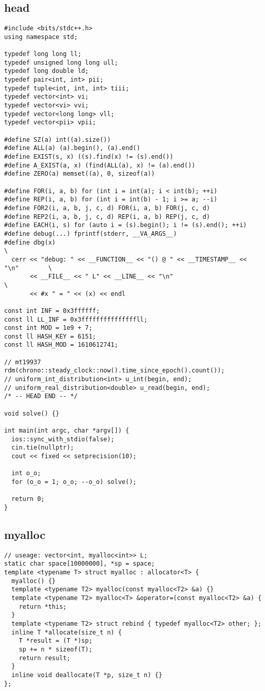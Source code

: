 \documentclass[twoside]{article}
\begin{document}
\subsection{head}
\begin{lstlisting}
#include <bits/stdc++.h>
using namespace std;

typedef long long ll;
typedef unsigned long long ull;
typedef long double ld;
typedef pair<int, int> pii;
typedef tuple<int, int, int> tiii;
typedef vector<int> vi;
typedef vector<vi> vvi;
typedef vector<long long> vll;
typedef vector<pii> vpii;

#define SZ(a) int((a).size())
#define ALL(a) (a).begin(), (a).end()
#define EXIST(s, x) ((s).find(x) != (s).end())
#define A_EXIST(a, x) (find(ALL(a), x) != (a).end())
#define ZERO(a) memset((a), 0, sizeof(a))

#define FOR(i, a, b) for (int i = int(a); i < int(b); ++i)
#define REP(i, a, b) for (int i = int(b) - 1; i >= a; --i)
#define FOR2(i, a, b, j, c, d) FOR(i, a, b) FOR(j, c, d)
#define REP2(i, a, b, j, c, d) REP(i, a, b) REP(j, c, d)
#define EACH(i, s) for (auto i = (s).begin(); i != (s).end(); ++i)
#define debug(...) fprintf(stderr, __VA_ARGS__)
#define dbg(x)                                                                 \
  cerr << "debug: " << __FUNCTION__ << "() @ " << __TIMESTAMP__ << "\n"        \
       << __FILE__ << " L" << __LINE__ << "\n"                                 \
       << #x " = " << (x) << endl

const int INF = 0x3ffffff;
const ll LL_INF = 0x3fffffffffffffffll;
const int MOD = 1e9 + 7;
const ll HASH_KEY = 6151;
const ll HASH_MOD = 1610612741;

// mt19937 rdm(chrono::steady_clock::now().time_since_epoch().count());
// uniform_int_distribution<int> u_int(begin, end);
// uniform_real_distribution<double> u_read(begin, end);
/* -- HEAD END -- */

void solve() {}

int main(int argc, char *argv[]) {
  ios::sync_with_stdio(false);
  cin.tie(nullptr);
  cout << fixed << setprecision(10);

  int o_o;
  for (o_o = 1; o_o; --o_o) solve();

  return 0;
}

\end{lstlisting}
\subsection{myalloc}
\begin{lstlisting}
// useage: vector<int, myalloc<int>> L;
static char space[10000000], *sp = space;
template <typename T> struct myalloc : allocator<T> {
  myalloc() {}
  template <typename T2> myalloc(const myalloc<T2> &a) {}
  template <typename T2> myalloc<T> &operator=(const myalloc<T2> &a) {
    return *this;
  }
  template <typename T2> struct rebind { typedef myalloc<T2> other; };
  inline T *allocate(size_t n) {
    T *result = (T *)sp;
    sp += n * sizeof(T);
    return result;
  }
  inline void deallocate(T *p, size_t n) {}
};

\end{lstlisting}
\end{document}
